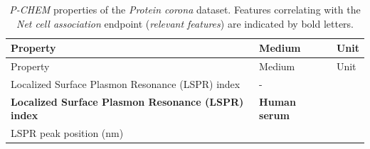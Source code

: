 \documentclass[utf8]{frontiersHLTH} %
\begin{document}
\begin{longtable}[]{@{}lll@{}}
\caption{\emph{P-CHEM} properties of the \emph{Protein corona} dataset.
Features correlating with the \emph{Net cell association} endpoint
(\emph{relevant features}) are indicated by bold letters.
}\tabularnewline
\toprule
\begin{minipage}[b]{0.58\columnwidth}\raggedright\strut
Property\strut
\end{minipage} & \begin{minipage}[b]{0.20\columnwidth}\raggedright\strut
Medium\strut
\end{minipage} & \begin{minipage}[b]{0.13\columnwidth}\raggedright\strut
Unit\strut
\end{minipage}\tabularnewline
\midrule
\endfirsthead
\toprule
\begin{minipage}[b]{0.58\columnwidth}\raggedright\strut
Property\strut
\end{minipage} & \begin{minipage}[b]{0.20\columnwidth}\raggedright\strut
Medium\strut
\end{minipage} & \begin{minipage}[b]{0.13\columnwidth}\raggedright\strut
Unit\strut
\end{minipage}\tabularnewline
\midrule
\endhead
\begin{minipage}[t]{0.58\columnwidth}\raggedright\strut
Localized Surface Plasmon Resonance (LSPR) index\strut
\end{minipage} & \begin{minipage}[t]{0.20\columnwidth}\raggedright\strut
-\strut
\end{minipage} & \begin{minipage}[t]{0.13\columnwidth}\raggedright\strut
\strut
\end{minipage}\tabularnewline
\begin{minipage}[t]{0.58\columnwidth}\raggedright\strut
\textbf{Localized Surface Plasmon Resonance (LSPR) index}\strut
\end{minipage} & \begin{minipage}[t]{0.20\columnwidth}\raggedright\strut
\textbf{Human serum}\strut
\end{minipage} & \begin{minipage}[t]{0.13\columnwidth}\raggedright\strut
\strut
\end{minipage}\tabularnewline
\begin{minipage}[t]{0.58\columnwidth}\raggedright\strut
LSPR peak position (nm)\strut

\end{minipage}
\end{longtable}
\end{document}
